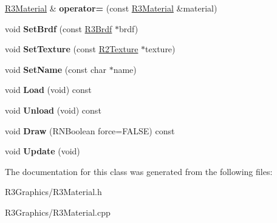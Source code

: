 \begin{DoxyCompactItemize}
\item 
\hyperlink{class_r3_material}{R3\+Material} \& {\bfseries operator=} (const \hyperlink{class_r3_material}{R3\+Material} \&material)\hypertarget{class_r3_material_a93047a9220941fff5885c0e5274378fc}{}\label{class_r3_material_a93047a9220941fff5885c0e5274378fc}

\item 
void {\bfseries Set\+Brdf} (const \hyperlink{class_r3_brdf}{R3\+Brdf} $\ast$brdf)\hypertarget{class_r3_material_a7617d0b887a214d2d794c11b3273cea9}{}\label{class_r3_material_a7617d0b887a214d2d794c11b3273cea9}

\item 
void {\bfseries Set\+Texture} (const \hyperlink{class_r2_texture}{R2\+Texture} $\ast$texture)\hypertarget{class_r3_material_aaaf20e075d37fbf2c504e3f5f7a82ad5}{}\label{class_r3_material_aaaf20e075d37fbf2c504e3f5f7a82ad5}

\item 
void {\bfseries Set\+Name} (const char $\ast$name)\hypertarget{class_r3_material_ad19d535b2a41ac81586404c8290f7358}{}\label{class_r3_material_ad19d535b2a41ac81586404c8290f7358}

\item 
void {\bfseries Load} (void) const \hypertarget{class_r3_material_afd6eceb62d8e0ffaa4ab97cba06f77c6}{}\label{class_r3_material_afd6eceb62d8e0ffaa4ab97cba06f77c6}

\item 
void {\bfseries Unload} (void) const \hypertarget{class_r3_material_ad9a302b69336d6d73eb0ed3bbd04abc4}{}\label{class_r3_material_ad9a302b69336d6d73eb0ed3bbd04abc4}

\item 
void {\bfseries Draw} (R\+N\+Boolean force=F\+A\+L\+SE) const \hypertarget{class_r3_material_ab7a8baf4b8a8307d7a875085189df145}{}\label{class_r3_material_ab7a8baf4b8a8307d7a875085189df145}

\item 
void {\bfseries Update} (void)\hypertarget{class_r3_material_a1486a2b33bd10f9a44f04088c0905809}{}\label{class_r3_material_a1486a2b33bd10f9a44f04088c0905809}

\end{DoxyCompactItemize}


The documentation for this class was generated from the following files\+:\begin{DoxyCompactItemize}
\item 
R3\+Graphics/R3\+Material.\+h\item 
R3\+Graphics/R3\+Material.\+cpp\end{DoxyCompactItemize}

